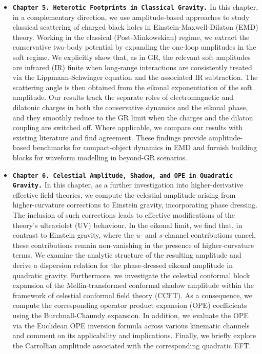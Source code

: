 \begin{itemize}[leftmargin=1.75em,topsep=0pt,itemsep=0.18em,parsep=0pt,partopsep=0pt]
  \item \textbf{\texttt{Chapter 5. Heterotic Footprints in Classical Gravity.}} In this chapter, in a complementary direction, we use amplitude-based approaches to study classical scattering of charged black holes in Einstein-Maxwell-Dilaton (EMD) theory. Working in the classical (Post-Minkowskian) regime, we extract the conservative two-body potential by expanding the one-loop amplitudes in the soft regime. We explicitly show that, as in GR, the relevant soft amplitudes are infrared (IR) finite when long-range interactions are consistently treated via the Lippmann-Schwinger equation and the associated IR subtraction. The scattering angle is then obtained from the eikonal exponentiation of the soft amplitude. Our results track the separate roles of electromagnetic and dilatonic charges in both the conservative dynamics and the eikonal phase, and they smoothly reduce to the GR limit when the charges and the dilaton coupling are switched off. Where applicable, we compare our results with existing literature and find agreement. These findings provide amplitude-based benchmarks for compact-object dynamics in EMD and furnish building blocks for waveform modelling in beyond-GR scenarios.

  \item \textbf{\texttt{Chapter 6. Celestial Amplitude, Shadow, and OPE in Quadratic Gravity.}} In this chapter, as a further investigation into higher-derivative effective field theories, we compute the celestial amplitude arising from higher-curvature corrections to Einstein gravity, incorporating phase dressing. The inclusion of such corrections leads to effective modifications of the theory's ultraviolet (UV) behaviour. In the eikonal limit, we find that, in contrast to Einstein gravity, where the $u$- and $s$-channel contributions cancel, these contributions remain non-vanishing in the presence of higher-curvature terms. We examine the analytic structure of the resulting amplitude and derive a dispersion relation for the phase-dressed eikonal amplitude in quadratic gravity. Furthermore, we investigate the celestial conformal block expansion of the Mellin-transformed conformal shadow amplitude within the framework of celestial conformal field theory (CCFT). As a consequence, we compute the corresponding operator product expansion (OPE) coefficients using the Burchnall-Chaundy expansion. In addition, we evaluate the OPE via the Euclidean OPE inversion formula across various kinematic channels and comment on its applicability and implications. Finally, we briefly explore the Carrollian amplitude associated with the corresponding quadratic EFT.
\end{itemize}
